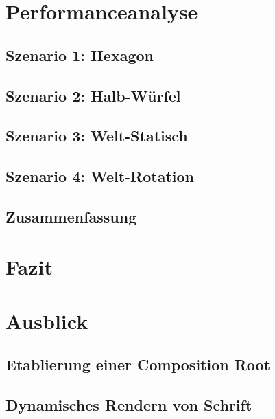 \documentclass[12pt,a4paper,listof=totocnumbered,parskip=half,numbers=noenddot]{scrartcl}
\begin{document}
\clearpage
\section{Performanceanalyse}

\subsection{Szenario 1: Hexagon}

\subsection{Szenario 2: Halb-Würfel}

\subsection{Szenario 3: Welt-Statisch}

\subsection{Szenario 4: Welt-Rotation}

%
\subsection{Zusammenfassung}


\pagebreak
\section{Fazit}
\pagebreak
\section{Ausblick}
\subsection{Etablierung einer Composition Root}\label{sec:EtablierungEinerKompositionroot}

\subsection{Dynamisches Rendern von Schrift}
\end{document}
